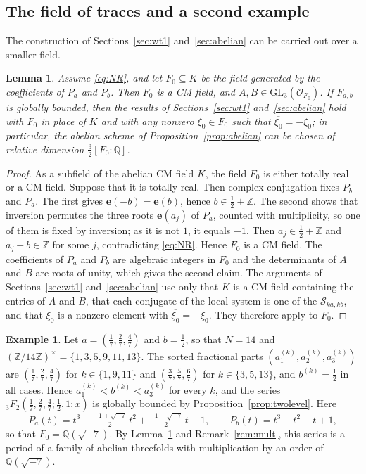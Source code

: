 \documentclass[11pt]{amsart}
\newtheorem{lemma}[theorem]{Lemma}
\theoremstyle{definition}
\newtheorem{example}[theorem]{Example}
\theoremstyle{remark}
\numberwithin{equation}{section}
\newcommand{\Q}{\mathbb{Q}}
\newcommand{\Z}{\mathbb{Z}}
\newcommand{\e}{\mathbf{e}}
\newcommand{\cS}{\mathcal{S}}
\newcommand{\cO}{\mathcal{O}}
\newcommand{\ak}[1]{a^{(k)}_{#1}}
\newcommand{\bk}{b^{(k)}}
\newcommand{\Fab}{F_{a,b}}
\begin{document}
\subsection{The field of traces and a second example}
The construction of Sections~\ref{sec:wt1} and~\ref{sec:abelian} can be carried out over a smaller field.

\begin{lemma}\label{lem:F0}
Assume \eqref{eq:NR}, and let $F_0\subseteq K$ be the field generated by the coefficients of $P_a$ and $P_b$. Then $F_0$ is a CM field, and $A,B\in\mathrm{GL}_3(\cO_{F_0})$. If $\Fab$ is globally bounded, then the results of Sections~\ref{sec:wt1} and~\ref{sec:abelian} hold with $F_0$ in place of $K$ and with any nonzero $\xi_0\in F_0$ such that $\overline{\xi_0}=-\xi_0$; in particular, the abelian scheme of Proposition~\ref{prop:abelian} can be chosen of relative dimension $\frac32[F_0:\Q]$.
\end{lemma}

\begin{proof}
As a subfield of the abelian CM field $K$, the field $F_0$ is either totally real or a CM field. Suppose that it is totally real. Then complex conjugation fixes $P_b$ and $P_a$. The first gives $\e(-b)=\e(b)$, hence $b\in\frac12+\Z$. The second shows that inversion permutes the three roots $\e(a_j)$ of $P_a$, counted with multiplicity, so one of them is fixed by inversion; as it is not $1$, it equals $-1$. Then $a_j\in\frac12+\Z$ and $a_j-b\in\Z$ for some $j$, contradicting \eqref{eq:NR}. Hence $F_0$ is a CM field. The coefficients of $P_a$ and $P_b$ are algebraic integers in $F_0$ and the determinants of $A$ and $B$ are roots of unity, which gives the second claim. The arguments of Sections~\ref{sec:wt1} and~\ref{sec:abelian} use only that $K$ is a CM field containing the entries of $A$ and $B$, that each conjugate of the local system is one of the $\cS_{ka,kb}$, and that $\xi_0$ is a nonzero element with $\overline{\xi_0}=-\xi_0$. They therefore apply to $F_0$.
\end{proof}

\begin{example}\label{ex:seven}
Let $a=(\frac17,\frac27,\frac47)$ and $b=\frac12$, so that $N=14$ and $(\Z/14\Z)^\times=\{1,3,5,9,11,13\}$. The sorted fractional parts $(\ak1,\ak2,\ak3)$ are $(\frac17,\frac27,\frac47)$ for $k\in\{1,9,11\}$ and $(\frac37,\frac57,\frac67)$ for $k\in\{3,5,13\}$, and $\bk=\frac12$ in all cases. Hence $\ak1<\bk<\ak3$ for every $k$, and the series ${}_3F_2(\frac17,\frac27,\frac47;\frac12,1;x)$ is globally bounded by Proposition~\ref{prop:twolevel}. Here
\[
P_a(t)=t^3-\tfrac{-1+\sqrt{-7}}2\,t^2+\tfrac{-1-\sqrt{-7}}2\,t-1,\qquad P_b(t)=t^3-t^2-t+1,
\]
so that $F_0=\Q(\sqrt{-7})$. By Lemma~\ref{lem:F0} and Remark~\ref{rem:mult}, this series is a period of a family of abelian threefolds with multiplication by an order of $\Q(\sqrt{-7})$.
\end{example}
\end{document}
